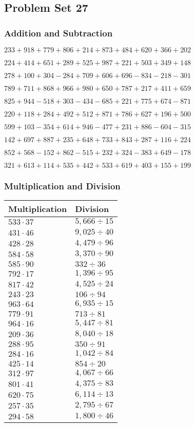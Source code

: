 \hypertarget{problem-set-27-2}{%
\subsection{Problem Set 27}\label{problem-set-27-2}}

\hypertarget{addition-and-subtraction-127}{%
\subsubsection{Addition and
Subtraction}\label{addition-and-subtraction-127}}

\(233 + 918 + 779 + 806 + 214 + 873 + 484 + 620 + 366 + 202\)

\(224 + 414 + 651 + 289 + 525 + 987 + 221 + 503 + 349 + 148\)

\(278 + 100 + 304 - 284 + 709 + 606 + 696 - 834 - 218 - 301\)

\(789 + 711 + 868 + 966 + 980 + 650 + 787 + 217 + 411 + 659\)

\(825 + 944 - 518 + 303 - 434 - 685 + 221 + 775 + 674 - 871\)

\(220 + 118 + 284 + 492 + 512 + 871 + 786 + 627 + 196 + 500\)

\(599 + 103 - 354 + 614 + 946 - 477 + 231 + 886 - 604 - 315\)

\(142 + 697 + 887 + 235 + 648 + 733 + 843 + 287 + 116 + 224\)

\(852 + 568 - 152 + 862 - 515 + 232 + 324 - 383 + 649 - 178\)

\(321 + 613 + 114 + 535 + 442 + 533 + 619 + 403 + 155 + 199\)

\hypertarget{multiplication-and-division-127}{%
\subsubsection{Multiplication and
Division}\label{multiplication-and-division-127}}

\begin{longtable}[]{@{}ll@{}}
\toprule
Multiplication & Division\tabularnewline
\midrule
\endhead
\(533 \cdot 37\) & \(5,666÷15\)\tabularnewline
\(431 \cdot 46\) & \(9,025÷40\)\tabularnewline
\(428 \cdot 28\) & \(4,479÷96\)\tabularnewline
\(584 \cdot 58\) & \(3,370÷90\)\tabularnewline
\(585 \cdot 90\) & \(332÷36\)\tabularnewline
\(792 \cdot 17\) & \(1,396÷95\)\tabularnewline
\(817 \cdot 42\) & \(4,525÷24\)\tabularnewline
\(243 \cdot 23\) & \(106÷94\)\tabularnewline
\(963 \cdot 64\) & \(6,935÷15\)\tabularnewline
\(779 \cdot 91\) & \(713÷81\)\tabularnewline
\(964 \cdot 16\) & \(5,447÷81\)\tabularnewline
\(209 \cdot 36\) & \(8,040÷18\)\tabularnewline
\(288 \cdot 95\) & \(350÷91\)\tabularnewline
\(284 \cdot 16\) & \(1,042÷84\)\tabularnewline
\(425 \cdot 14\) & \(854÷20\)\tabularnewline
\(312 \cdot 97\) & \(4,067÷66\)\tabularnewline
\(801 \cdot 41\) & \(4,375÷83\)\tabularnewline
\(620 \cdot 75\) & \(6,114÷13\)\tabularnewline
\(257 \cdot 35\) & \(2,795÷67\)\tabularnewline
\(294 \cdot 58\) & \(1,800÷46\)\tabularnewline
\bottomrule
\end{longtable}

